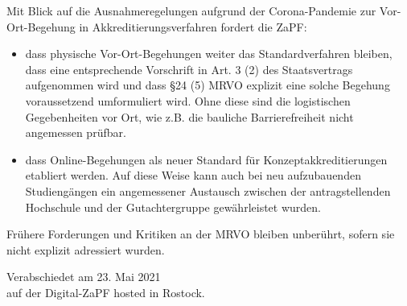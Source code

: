 \documentclass[DIV=calc]{scrartcl}
\begin{document}
Mit Blick auf die Ausnahmeregelungen aufgrund der Corona-Pandemie zur Vor-Ort-Begehung in Akkreditierungsverfahren fordert die ZaPF:

\begin{itemize}
	\item dass physische Vor-Ort-Begehungen weiter das Standardverfahren bleiben, dass eine entsprechende Vorschrift in Art. 3 (2) des Staatsvertrags aufgenommen wird und dass §24 (5) MRVO explizit eine solche Begehung voraussetzend umformuliert wird. Ohne diese sind die logistischen Gegebenheiten vor Ort, wie z.B. die bauliche Barrierefreiheit nicht angemessen prüfbar. 
	
	\item dass Online-Begehungen als neuer Standard für Konzeptakkreditierungen etabliert werden. Auf diese Weise kann auch bei neu aufzubauenden Studiengängen ein angemessener Austausch zwischen der antragstellenden Hochschule und der Gutachtergruppe gewährleistet wurden.
\end{itemize}

Frühere Forderungen und Kritiken an der MRVO bleiben unberührt, sofern sie nicht explizit adressiert wurden.
\vspace{1cm} 

\vfill
\begin{flushright}
	Verabschiedet am 23. Mai 2021 \\
	auf der Digital-ZaPF hosted in Rostock.
\end{flushright}
\end{document}
